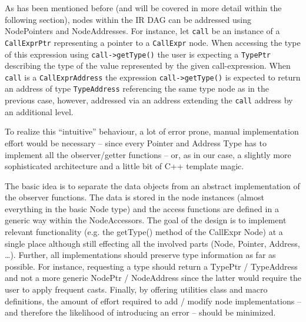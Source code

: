 As has been mentioned before (and will be covered in more detail within the
following section), nodes within the IR DAG can be addressed using NodePointers
and NodeAddresses. For instance, let \lstinline|call|
be an instance of a \lstinline|CallExprPtr| representing a pointer to a
\lstinline|CallExpr| node.
When accessing the type of this expression using \lstinline|call->getType()| the
user is expecting a \lstinline|TypePtr| describing the type of the value
represented by the given call-expression. When \lstinline|call| is a
\lstinline|CallExprAddress| the expression \lstinline|call->getType()| is
expected to return an address of type \lstinline|TypeAddress| referencing the
same type node as in the previous case, however, addressed via an address
extending the \lstinline|call| address by an additional level.

To realize this ``intuitive'' behaviour, a lot of error prone, manual
implementation effort would be necessary -- since every Pointer and Address Type
has to implement all the observer/getter functions -- or, as in our case, a
slightly more sophisticated architecture and a little bit of C++ template
magic.

The basic idea is to separate the data objects from an abstract implementation
of the observer functions. The data is stored in the node instances (almost
everything in the basic Node type) and the access functions are defined in a
generic way within the NodeAccessors. The goal of the design is to implement
relevant functionality (e.g. the getType() method of the CallExpr Node) at a
single place although still effecting all the involved parts (Node, Pointer,
Address, \ldots). Further, all implementations should preserve type information
as far as possible. For instance, requesting a type should return a TypePtr /
TypeAddress and not a more generic NodePtr / NodeAddress since the latter would
require the user to apply frequent casts. Finally, by offering utilities class
and macro definitions, the amount of effort required to add / modify node
implementations -- and therefore the likelihood of introducing an error --
should be minimized.

